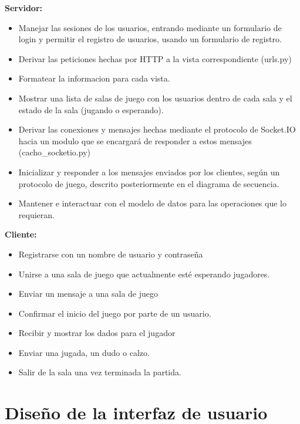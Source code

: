 \documentclass[a4paper,11pt]{article}
\begin{document}
\textbf{Servidor:}
\begin{itemize}
	\item Manejar las sesiones de los usuarios, entrando
	mediante un formulario de login y permitir el registro de usuarios,
	usando un formulario de registro.
	\item Derivar las peticiones hechas por HTTP a la vista
	correspondiente (urls.py)
	\item Formatear la informacion para cada vista.
	\item Mostrar una lista de salas de juego con los usuarios
	dentro de cada sala y el estado de la sala (jugando o esperando).
	\item Derivar las conexiones y mensajes hechas mediante el 
	protocolo de Socket.IO hacia un modulo que se encargará de responder
	a estos mensajes (cacho\_socketio.py)
	\item Inicializar y responder a los mensajes enviados por los clientes,
	según un protocolo de juego, descrito posteriormente en el 
	diagrama de secuencia.
	\item Mantener e interactuar con el modelo de datos para las
	operaciones que lo requieran.
\end{itemize}
\vspace{0.7cm}
\textbf{Cliente:}
\begin{itemize}
	\item Registrarse con un nombre de usuario y contraseña
	\item Unirse a una sala de juego que actualmente esté esperando
	jugadores.
	\item Enviar un mensaje a una sala de juego
	\item Confirmar el inicio del juego por parte de un usuario.
	\item Recibir y mostrar los dados para el jugador
	\item Enviar una jugada, un dudo o calzo.
	\item Salir de la sala una vez terminada la partida.
\end{itemize}
\newpage

\section{Diseño de la interfaz de usuario}
\end{document}

